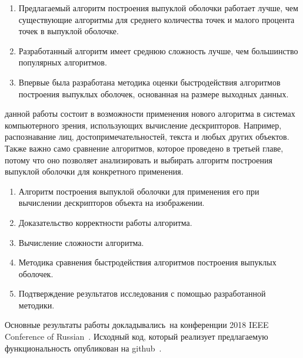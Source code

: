 {\novelty}
\begin{enumerate}
	\item Предлагаемый алгоритм построения выпуклой оболочки работает лучше, чем существующие алгоритмы для среднего количества точек и малого процента точек в выпуклой оболочке.
	\item Разработанный алгоритм имеет среднюю сложность лучше, чем большинство популярных алгоритмов.
	\item Впервые была разработана методика оценки быстродействия алгоритмов построения выпуклых оболочек, основанная на размере выходных данных.
\end{enumerate}

{\influence} данной работы состоит в возможности применения нового алгоритма в системах компьютерного зрения, использующих вычисление дескрипторов. Например, распознавание лиц, достопримечательностей, текста и любых других объектов. Также важно само сравнение алгоритмов, которое проведено в третьей главе, потому что оно позволяет анализировать и выбирать алгоритм построения выпуклой оболочки для конкретного применения.

{}
\begin{enumerate}
 	\item Алгоритм построения выпуклой оболочки для применения его при вычислении дескрипторов объекта на изображении.
	\item Доказательство корректности работы алгоритма.
	\item Вычисление сложности алгоритма.
	\item Методика сравнения быстродействия алгоритмов построения выпуклых оболочек.
	\item Подтверждение результатов исследования с помощью разработанной методики.
\end{enumerate}

{\probation}
Основные результаты работы докладывались~на конференции 2018 IEEE Conference of Russian~\cite{matrokhin2018convex}. Исходный код, который реализует предлагаемую функциональность опубликован на github~\cite{matrokhin2017github}.
